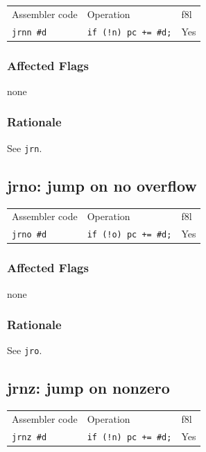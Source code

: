 \documentclass{book}
\begin{document}
\begin{tabular}{l l l}
Assembler code    & Operation                   & f8l \\
\texttt{jrnn \#d} & \texttt{if (!n) pc += \#d;} & Yes \\
\end{tabular}

\subsubsection*{Affected Flags}

none

\subsubsection*{Rationale}

See \texttt{jrn}.


\subsection{jrno: jump on no overflow}

\begin{tabular}{l l l}
Assembler code    & Operation                   & f8l \\
\texttt{jrno \#d} & \texttt{if (!o) pc += \#d;} & Yes \\
\end{tabular}

\subsubsection*{Affected Flags}

none

\subsubsection*{Rationale}

See \texttt{jro}.


\subsection{jrnz: jump on nonzero}

\begin{tabular}{l l l}
Assembler code    & Operation                   & f8l \\
\texttt{jrnz \#d} & \texttt{if (!n) pc += \#d;} & Yes \\
\end{tabular}
\end{document}
